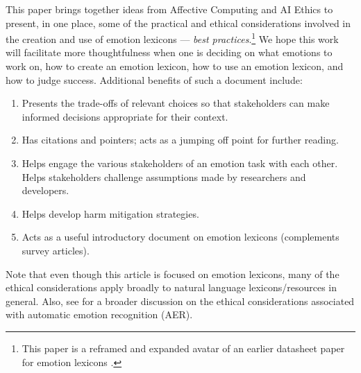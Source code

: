 \documentclass[11pt]{article}
\begin{document}
This paper brings together ideas from Affective Computing and AI Ethics to present, in one place, some of the practical and ethical  considerations involved in the creation and use of emotion lexicons ---  \textit{best practices}.\footnote{This paper is a reframed and expanded avatar of an earlier datasheet paper for emotion lexicons  \cite{mohammad2020practical}.} 
We hope this work will facilitate more thoughtfulness when one is deciding on what emotions to work on, how to create an emotion lexicon, %
how to use an emotion lexicon, and how to judge success. %
Additional benefits of such a document include:
\vspace*{-1mm}
\begin{enumerate}
    \item Presents the trade-offs of relevant choices so that stakeholders can make informed decisions appropriate for their context. \\[-16pt]
    \item Has citations and pointers; acts as a jumping off point for further reading.\\[-16pt]
    \item Helps engage the various stakeholders of an emotion task with each other. Helps stakeholders challenge assumptions made by researchers and developers.\\[-16pt]  %
     \item Helps develop harm mitigation strategies.\\[-16pt]
    \item Acts as a useful introductory document on emotion lexicons (complements survey articles).
\end{enumerate}
\vspace*{-1mm}
\noindent Note that even though this article is focused on emotion lexicons, many of the ethical considerations apply broadly to natural language lexicons/resources in general. %
Also, see  for a broader discussion on the ethical considerations associated with automatic emotion recognition (AER).
\end{document}
